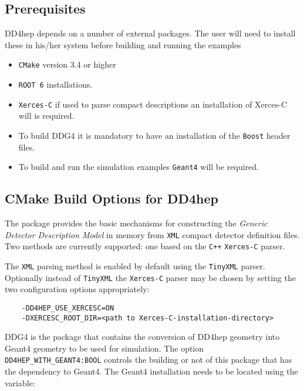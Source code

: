 \subsection{Prerequisites}
\label{sec:dd4hep-user-manual-prerequisites}

DD4hep depends on a number of external packages. The user will need to install these in his/her system before building and running the examples
\begin{itemize}
\item \texttt{CMake} version 3.4 or higher 
\item \texttt{ROOT 6} installations.
\item \texttt{Xerces-C} if used to parse compact descriptions an installation of {Xerces-C} will is required.
\item To build DDG4 it is mandatory to have an installation of the \texttt{Boost} header files.
\item To build and run the simulation examples \texttt{Geant4} will be required. 
\end{itemize}

\subsection{CMake Build Options for DD4hep}
\label{sec:dd4hep-user-manual-building}

The package provides the basic mechanisms for constructing the \textit{Generic Detector Description Model} in memory from \texttt{XML} compact detector definition files. Two methods are currently supported: one based
on the \texttt{C++} \texttt{Xerces-C} parser.

The \texttt{XML} parsing method is enabled by default using the \texttt{TinyXML} parser. Optionally instead of \texttt{TinyXML} the \texttt{Xerces-C}  parser may be chosen by setting the two configuration options appropriately:

\begin{verbatim}
    -DD4HEP_USE_XERCESC=ON
    -DXERCESC_ROOT_DIR=<path to Xerces-C-installation-directory>
\end{verbatim}

DDG4 is the package that contains the conversion of DD4hep geometry into Geant4 geometry to be used for simulation. The option \texttt{DD4HEP\_WITH\_GEANT4:BOOL} controls the building or not of this package that has the dependency to Geant4. The Geant4 installation needs to be located using the variable:

